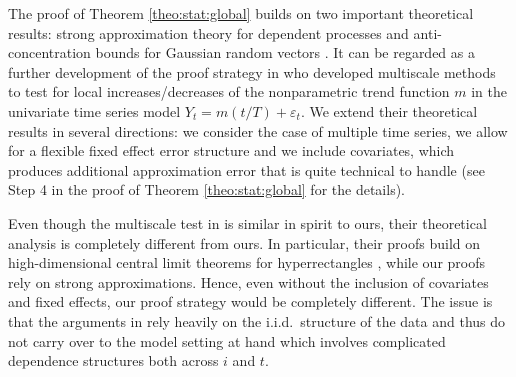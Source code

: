 \documentclass[12pt]{article}
\begin{document}
\begin{remark}\label{remark:general-theo-1}
The proof of Theorem \ref{theo:stat:global} builds on two important theoretical results: strong approximation theory for dependent processes \citep{BerkesLiuWu2014} and anti-concentration bounds for Gaussian random vectors \citep{Nazarov2003}. It can be regarded as a further development of the proof strategy in \cite{KhismatullinaVogt2020} who developed multiscale methods to test for local increases/decreases of the nonparametric trend function $m$ in the univariate time series model $Y_t = m(t/T) + \varepsilon_t$. We extend their theoretical results in several directions: we consider the case of multiple time series, we allow for a  flexible fixed effect error structure and we include covariates, which produces additional approximation error that is quite technical to handle (see Step 4 in the proof of Theorem \ref{theo:stat:global} for the details). 
\end{remark}


\begin{remark}\label{remark:general-theo-2}
Even though the multiscale test in \cite{KhismatullinaVogt2023} is similar in spirit to ours, their theoretical analysis is completely different from ours. In particular, their proofs build on high-dimensional central limit theorems for hyperrectangles \citep{Chernozhukov2017}, while our proofs rely on strong approximations. Hence, even without the inclusion of covariates and fixed effects, our proof strategy would be completely different. The issue is that the arguments in \cite{KhismatullinaVogt2023} rely heavily on the i.i.d.\ structure of the data and thus do not carry over to the model setting at hand which involves complicated dependence structures both across $i$ and $t$.
\end{remark}
\end{document}
